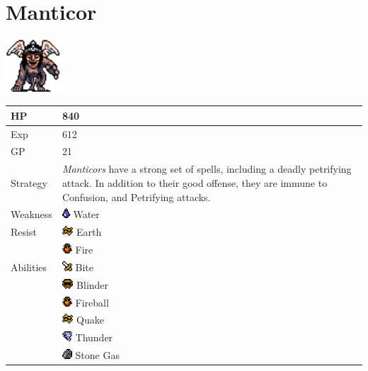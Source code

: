 \section{Manticor}
\label{monster:manticor}

\includegraphics[height=2cm,keepaspectratio]{./resources/monster/manticor}

\begin{longtable}{ l p{9cm} }
	HP
	& 840
\\ \hline
	Exp
	& 612
\\ \hline
	GP
	& 21
\\ \hline
	Strategy
	& \textit{Manticors} have a strong set of spells, including a deadly petrifying attack. In addition to their good offense, they are immune to Confusion, and Petrifying attacks.
\\ \hline
	Weakness
	& \includegraphics[height=1em,keepaspectratio]{./resources/effects/water} Water
\\ \hline
	Resist
	& \includegraphics[height=1em,keepaspectratio]{./resources/effects/earth} Earth \\
	& \includegraphics[height=1em,keepaspectratio]{./resources/effects/fire} Fire
\\ \hline
	Abilities
	& \includegraphics[height=1em,keepaspectratio]{./resources/effects/damage} Bite \\
	& \includegraphics[height=1em,keepaspectratio]{./resources/effects/blind} Blinder \\
	& \includegraphics[height=1em,keepaspectratio]{./resources/effects/fire} Fireball \\
	& \includegraphics[height=1em,keepaspectratio]{./resources/effects/earth} Quake \\
	& \includegraphics[height=1em,keepaspectratio]{./resources/effects/wind} Thunder \\
	& \includegraphics[height=1em,keepaspectratio]{./resources/effects/petrify} Stone Gas
\end{longtable}
